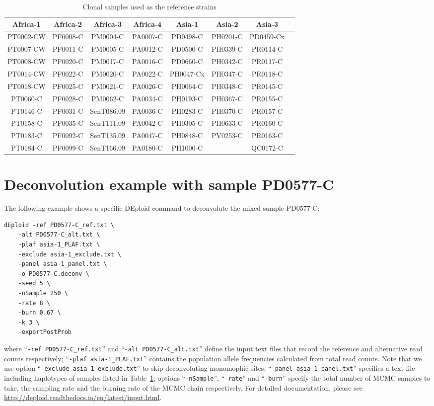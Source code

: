 \documentclass{article}
\begin{document}
\begin{table}[ht]
\centering
\begin{tabular}{|c|c|c|c|c|c|c|c|}
\hline\hline
Africa-1	&	Africa-2	&	Africa-3	&	Africa-4	&	Asia-1	&	Asia-2	&	Asia-3	\\
\hline
PT0002-CW	&	PF0008-C	&	PM0004-C	&	PA0007-C	&	PD0498-C	&	PH0201-C	&	PD0459-Cx	\\
PT0007-CW	&	PF0011-C	&	PM0005-C	&	PA0012-C	&	PD0500-C	&	PH0339-C	&	PR0114-C	\\
PT0008-CW	&	PF0020-C	&	PM0017-C	&	PA0016-C	&	PD0660-C	&	PH0342-C	&	PR0117-C	\\
PT0014-CW	&	PF0022-C	&	PM0020-C	&	PA0022-C	&	PH0047-Cx	&	PH0347-C	&	PR0118-C	\\
PT0018-CW	&	PF0025-C	&	PM0021-C	&	PA0026-C	&	PH0064-C	&	PH0348-C	&	PR0145-C	\\
PT0060-C	&	PF0028-C	&	PM0062-C	&	PA0034-C	&	PH0193-C	&	PH0367-C	&	PR0155-C	\\
PT0146-C	&	PF0031-C	&	SenT086.09	&	PA0036-C	&	PH0283-C	&	PH0370-C	&	PR0157-C	\\
PT0158-C	&	PF0035-C	&	SenT111.09	&	PA0042-C	&	PH0305-C	&	PH0633-C	&	PR0160-C	\\
PT0183-C	&	PF0092-C	&	SenT135.09	&	PA0047-C	&	PH0848-C	&	PV0253-C	&	PR0163-C	\\
PT0184-C	&	PF0099-C	&	SenT166.09	&	PA0180-C	&	PH1000-C	&		&	QC0172-C	\\
\hline\hline
\end{tabular}
\caption{Clonal samples used as the reference strains}\label{tab:panelSamples}
\end{table}


\section{Deconvolution example with sample PD0577-C}

The following example shows a specific {\textmd DEploid} command to deconvolute the mixed sample {\textmd PD0577-C}:
\linespread{1}
\begin{lstlisting}
dEploid -ref PD0577-C_ref.txt \
    -alt PD0577-C_alt.txt \
    -plaf asia-1_PLAF.txt \
    -exclude asia-1_exclude.txt \
    -panel asia-1_panel.txt \
    -o PD0577-C.deconv \
    -seed 5 \
    -nSample 250 \
    -rate 8 \
    -burn 0.67 \
    -k 3 \
    -exportPostProb
\end{lstlisting}
\linespread{1.5}
where ``{\tt -ref PD0577-C\_ref.txt}'' and ``{\tt -alt PD0577-C\_alt.txt}'' define the input text files that record the reference and alternative read counts respectively; ``{\tt -plaf asia-1\_PLAF.txt}'' contains the population allele frequencies calculated from total read counts. Note that we use option ``{\tt -exclude asia-1\_exclude.txt}'' to skip deconvoluting monomophic sites; ``{\tt -panel asia-1\_panel.txt}'' specifies a text file including haplotypes of samples listed in Table~\ref{tab:panelSamples}; options ``{\tt -nSample}'', ``{\tt -rate}'' and ``{\tt -burn}'' specify the total number of MCMC samples to take, the sampling rate and the burning rate of the MCMC chain respectively. For detailed documentation, please see \url{http://deploid.readthedocs.io/en/latest/input.html}.
\end{document}
